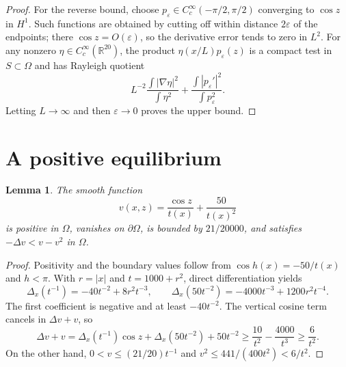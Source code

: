 \documentclass[11pt,a4paper]{article}
\newtheorem{lemma}[theorem]{Lemma}
\newcommand{\R}{\mathbb R}
\newcommand{\Om}{\Omega}
\begin{document}
\begin{proof}
For the reverse bound, choose $p_\varepsilon\in C_c^\infty(-\pi/2,\pi/2)$
converging to $\cos z$ in $H^1$. Such functions are obtained by cutting off
within distance $2\varepsilon$ of the endpoints; there $\cos z=O(\varepsilon)$,
so the derivative error tends to zero in $L^2$. For any nonzero
$\eta\in C_c^\infty(\R^{20})$, the product
$\eta(x/L)p_\varepsilon(z)$ is a compact test in $S\subset\Om$ and has
Rayleigh quotient
\[
 L^{-2}\frac{\int|\nabla\eta|^2}{\int\eta^2}
 +\frac{\int|p_\varepsilon'|^2}{\int p_\varepsilon^2}.
\]
Letting $L\to\infty$ and then $\varepsilon\to0$ proves the upper bound.
\end{proof}

\section{A positive equilibrium}
\begin{lemma}\label{lem:subsolution}
The smooth function
\begin{equation}\label{eq:subsolution}
 v(x,z)=\frac{\cos z}{t(x)}+\frac{50}{t(x)^2}
\end{equation}
is positive in $\Om$, vanishes on $\partial\Om$, is bounded by $21/20000$,
and satisfies $-\Delta v<v-v^2$ in $\Om$.
\end{lemma}
\begin{proof}
Positivity and the boundary values follow from
$\cos h(x)=-50/t(x)$ and $h<\pi$. With $r=|x|$ and $t=1000+r^2$,
direct differentiation yields
\[
 \Delta_x(t^{-1})=-40t^{-2}+8r^2t^{-3},\qquad
 \Delta_x(50t^{-2})=-4000t^{-3}+1200r^2t^{-4}.
\]
The first coefficient is negative and at least $-40t^{-2}$.
The vertical cosine term cancels in $\Delta v+v$, so
\[
 \Delta v+v
 =\Delta_x(t^{-1})\cos z+\Delta_x(50t^{-2})+50t^{-2}
 \ge\frac{10}{t^2}-\frac{4000}{t^3}\ge\frac6{t^2}.
\]
On the other hand, $0<v\le(21/20)t^{-1}$ and
$v^2\le441/(400t^2)<6/t^2$.
\end{proof}
\end{document}
